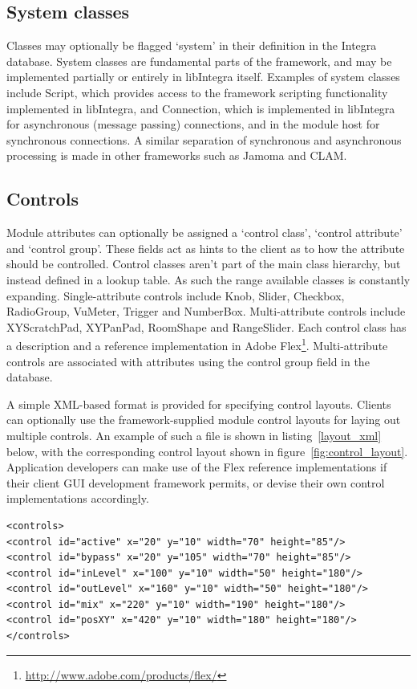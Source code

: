 \documentclass[twoside,10pt,a4paper]{article}
\begin{document}
\subsection{System classes}

Classes may optionally be flagged `system' in their definition in the Integra database. System classes are fundamental parts of the framework, and may be implemented partially or entirely in libIntegra itself. Examples of system classes include Script, which provides access to the framework scripting functionality implemented in libIntegra, and Connection, which is implemented in libIntegra for asynchronous (message passing) connections, and in the module host for synchronous connections. A similar separation of synchronous and asynchronous processing is made in other frameworks such as Jamoma\cite{Place:00} and CLAM\cite{Amatriain:00}.

\subsection{Controls}

Module attributes can optionally be assigned a `control class', `control attribute' and `control group'. These fields act as hints to the client as to how the attribute should be controlled. Control classes aren't part of the main class hierarchy, but instead defined in a lookup table. As such the range available classes is constantly expanding. Single-attribute controls include Knob, Slider, Checkbox, RadioGroup, VuMeter, Trigger and NumberBox. Multi-attribute controls include XYScratchPad, XYPanPad, RoomShape and RangeSlider. Each control class has a description and a reference implementation in Adobe Flex\footnote{\href{http://www.adobe.com/products/flex/}{http://www.adobe.com/products/flex/}}. Multi-attribute controls are associated with attributes using the control group field in the database.

A simple XML-based format is provided for specifying control layouts. Clients can optionally use the frame\-work-supplied module control layouts for laying out multiple controls. An example of such a file is shown in listing~\ref{layout_xml} below, with the corresponding control layout shown in figure~\ref{fig:control_layout}. Application developers can make use of the Flex reference implementations if their client GUI development framework permits, or devise their own control implementations accordingly.

\begin{lstlisting}[label=layout_xml,caption=Module control layout XML]
<controls>
<control id="active" x="20" y="10" width="70" height="85"/>
<control id="bypass" x="20" y="105" width="70" height="85"/>
<control id="inLevel" x="100" y="10" width="50" height="180"/>
<control id="outLevel" x="160" y="10" width="50" height="180"/>
<control id="mix" x="220" y="10" width="190" height="180"/>
<control id="posXY" x="420" y="10" width="180" height="180"/>
</controls>
\end{lstlisting}
\end{document}
